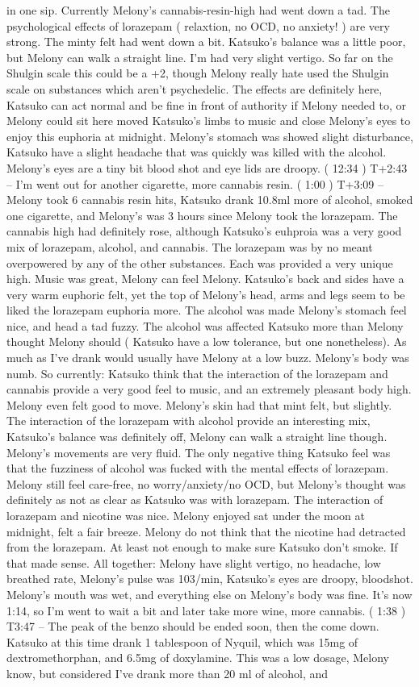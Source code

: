 \documentclass[12pt]{book}
\begin{document}
in one sip. Currently Melony's cannabis-resin-high had went down a tad. The psychological effects of lorazepam ( relaxtion, no OCD, no anxiety! ) are very strong. The minty felt had went down a bit. Katsuko's balance was a little poor, but Melony can walk a straight line. I'm had very slight vertigo. So far on the Shulgin scale this could be a +2, though Melony really hate used the Shulgin scale on substances which aren't psychedelic. The effects are definitely here, Katsuko can act normal and be fine in front of authority if Melony needed to, or Melony could sit here moved Katsuko's limbs to music and close Melony's eyes to enjoy this euphoria at midnight. Melony's stomach was showed slight disturbance, Katsuko have a slight headache that was quickly was killed with the alcohol. Melony's eyes are a tiny bit blood shot and eye lids are droopy. ( 12:34 ) T+2:43 -- I'm went out for another cigarette, more cannabis resin. ( 1:00 ) T+3:09 -- Melony took 6 cannabis resin hits, Katsuko drank 10.8ml more of alcohol, smoked one cigarette, and Melony's was 3 hours since Melony took the lorazepam. The cannabis high had definitely rose, although Katsuko's euhproia was a very good mix of lorazepam, alcohol, and cannabis. The lorazepam was by no meant overpowered by any of the other substances. Each was provided a very unique high. Music was great, Melony can feel Melony. Katsuko's back and sides have a very warm euphoric felt, yet the top of Melony's head, arms and legs seem to be liked the lorazepam euphoria more. The alcohol was made Melony's stomach feel nice, and head a tad fuzzy. The alcohol was affected Katsuko more than Melony thought Melony should ( Katsuko have a low tolerance, but one nonetheless). As much as I've drank would usually have Melony at a low buzz. Melony's body was numb. So currently: Katsuko think that the interaction of the lorazepam and cannabis provide a very good feel to music, and an extremely pleasant body high. Melony even felt good to move. Melony's skin had that mint felt, but slightly. The interaction of the lorazepam with alcohol provide an interesting mix, Katsuko's balance was definitely off, Melony can walk a straight line though. Melony's movements are very fluid. The only negative thing Katsuko feel was that the fuzziness of alcohol was fucked with the mental effects of lorazepam. Melony still feel care-free, no worry/anxiety/no OCD, but Melony's thought was definitely as not as clear as Katsuko was with lorazepam. The interaction of lorazepam and nicotine was nice. Melony enjoyed sat under the moon at midnight, felt a fair breeze. Melony do not think that the nicotine had detracted from the lorazepam. At least not enough to make sure Katsuko don't smoke. If that made sense. All together: Melony have slight vertigo, no headache, low breathed rate, Melony's pulse was 103/min, Katsuko's eyes are droopy, bloodshot. Melony's mouth was wet, and everything else on Melony's body was fine. It's now 1:14, so I'm went to wait a bit and later take more wine, more cannabis. ( 1:38 ) T3:47 -- The peak of the benzo should be ended soon, then the come down. Katsuko at this time drank 1 tablespoon of Nyquil, which was 15mg of dextromethorphan, and 6.5mg of doxylamine. This was a low dosage, Melony know, but considered I've drank more than 20 ml of alcohol, and 
\end{document}
